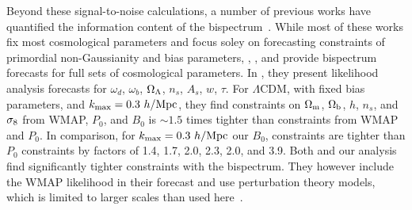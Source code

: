 Beyond these signal-to-noise calculations, a number of previous works 
have quantified the information content of the bispectrum~\citep{scoccimarro2004, sefusatti2006, sefusatti2007, song2015, tellarini2016, yamauchi2017a, karagiannis2018, yankelevich2019, chudaykin2019}. 
While most of these works fix most cosmological parameters and focus soley 
on forecasting constraints of primordial non-Gaussianity and bias parameters, 
\cite{sefusatti2006}, \cite{yankelevich2019}, and \cite{chudaykin2019} provide 
bispectrum forecasts for full sets of cosmological parameters. In \cite{sefusatti2006}, 
they present likelihood analysis forecasts for $\omega_d$, $\omega_b$, $\Omega_\Lambda$, 
$n_s$, $A_s$, $w$, $\tau$. %
For $\Lambda$CDM, with fixed bias parameters, and $k_{\rm max} = 0.3~h/{\rm Mpc}$, 
they find constraints on $\Omega_{\rm m}$, $\Omega_{\rm b}$, $h$, $n_s$, and $\sigma_8$ from WMAP, 
$P_0$, and $B_0$ is $\sim 1.5$ times tighter than constraints from WMAP 
and $P_0$. In comparison, for 
$k_{\rm max} = 0.3~h/{\rm Mpc}$ our $B_0$, constraints are tighter than $P_0$ constraints 
by factors of 1.4, 1.7, 2.0, 2.3, 2.0, and 3.9. Both \cite{sefusatti2006} and our 
analysis find significantly tighter constraints with the bispectrum. 
They however include the WMAP likelihood in their forecast and use 
perturbation theory models, which is limited to larger scales than used 
here~\citep{scoccimarro1998a, scoccimarro1999a, sefusatti2010, pollack2012, gil-marin2014, lazanu2016, eggemeier2019}.

